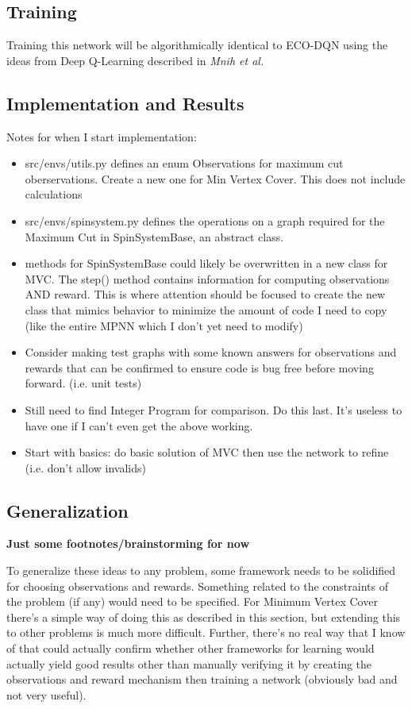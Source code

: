 \documentclass{article}
\begin{document}
\subsection{Training}

Training this network will be algorithmically identical to ECO-DQN using the ideas from Deep Q-Learning described in \textit{Mnih et al.} \cite{deepmind_2015}

\subsection{Implementation and Results}

Notes for when I start implementation: 

\begin{itemize}
    \item src/envs/utils.py defines an enum Observations for maximum cut oberservations. Create a new one for Min Vertex Cover. This does not include calculations
    \item src/envs/spinsystem.py defines the operations on a graph required for the Maximum Cut in SpinSystemBase, an abstract class. 
    \item methods for SpinSystemBase could likely be overwritten in a new class for MVC. The step() method contains information for computing observations AND reward. This is where attention should be focused to create the new class that mimics behavior to minimize the amount of code I need to copy (like the entire MPNN which I don't yet need to modify)
    \item Consider making test graphs with some known answers for observations and rewards that can be confirmed to ensure code is bug free before moving forward. (i.e. unit tests)
    \item Still need to find Integer Program for comparison. Do this last. It's useless to have one if I can't even get the above working.
    \item Start with basics: do basic solution of MVC then use the network to refine (i.e. don't allow invalids)
\end{itemize}

\subsection{Generalization}

\textbf{Just some footnotes/brainstorming for now}

To generalize these ideas to any problem, some framework needs to be solidified for choosing observations and rewards. Something related to the constraints of the problem (if any) would need to be specified. For Minimum Vertex Cover there's a simple way of doing this as described in this section, but extending this to other problems is much more difficult. Further, there's no real way that I know of that could actually confirm whether other frameworks for learning would actually yield good results other than manually verifying it by creating the observations and reward mechanism then training a network (obviously bad and not very useful).
\end{document}
